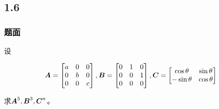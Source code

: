 \documentclass[9pt,xcolor=svgnames]{beamer} %
\begin{document}
\subsection*{1.6}
\begin{frame}
    \frametitle{题面}
    设

    \begin{equation*}
        \boldsymbol{A}=\begin{bmatrix}a&0&0\\0&b&0\\0&0&c\end{bmatrix},
        \boldsymbol{B}=\begin{bmatrix}0&1&0\\0&0&1\\0&0&0\end{bmatrix},
        \boldsymbol{C}=\begin{bmatrix}\cos \theta&\sin \theta\\-\sin \theta&\cos \theta\end{bmatrix}
    \end{equation*}

    求\(\boldsymbol{A}^5,\boldsymbol{B}^3,\boldsymbol{C}^n\)。
\end{frame}
\end{document}
